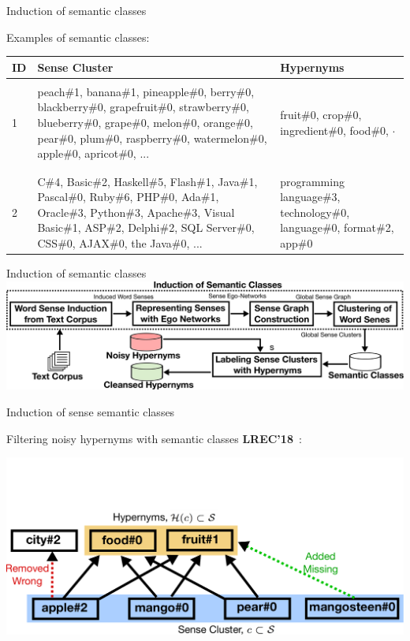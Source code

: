 \begin{frame}{Induction of  semantic classes}

Examples of semantic classes:


\begin{table}[ht]
\centering
\scriptsize
\begin{tabular}{l|p{6cm}|p{3.5cm}} 

\bf ID &  \bf Sense Cluster & \bf Hypernyms \\ \hline
& &  \\
1 & peach\#1, banana\#1, pineapple\#0, berry\#0, blackberry\#0, grapefruit\#0, strawberry\#0, blueberry\#0, grape\#0, melon\#0, orange\#0, pear\#0, plum\#0, raspberry\#0, watermelon\#0, apple\#0, apricot\#0, ...  &  fruit\#0, crop\#0, ingredient\#0, food\#0, $\cdot$ \\ & &  \\ \hline
& &  \\
2  & C\#4, Basic\#2, Haskell\#5, Flash\#1, Java\#1, Pascal\#0, Ruby\#6, PHP\#0, Ada\#1, Oracle\#3, Python\#3, Apache\#3, Visual Basic\#1, ASP\#2, Delphi\#2, SQL Server\#0, CSS\#0, AJAX\#0, the Java\#0, ... & programming language\#3, technology\#0, language\#0, format\#2, app\#0 
\end{tabular}
\end{table}

	
\end{frame}



\begin{frame}{Induction of  semantic classes}
	\includegraphics[width=1.0\textwidth]{figures/outline-semantic-classes}
\end{frame}




\begin{frame}{Induction of sense semantic classes}

Filtering noisy hypernyms with semantic classes \textbf{LREC'18}~\cite{panchenko:2018:SemanticClasses}: 

	\centering \includegraphics[width=1.0\textwidth]{figures/coset}
	
\end{frame}


